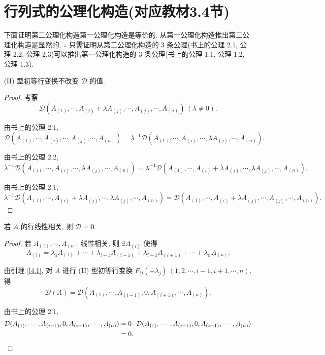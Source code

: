\documentclass{ctexart}
\begin{document}
\section{行列式的公理化构造(对应教材3.4节)}
下面证明第二公理化构造第一公理化构造是等价的. 从第一公理化构造推出第二公理化构造是显然的, $\therefore$ 只需证明从第二公理化构造的 3 条公理(书上的公理 2.1, 公理 2.2, 公理 2.3)可以推出第一公理化构造的 3 条公理(书上的公理 1.1, 公理 1.2, 公理 1.3).
\begin{lemma}\label{l4.1}
    (II) 型初等行变换不改变 $\mathcal{D}$ 的值.
\end{lemma}
\begin{proof}
    考察
    \[\mathcal{D}(A_{(1)},\cdots,A_{(i)}+\lambda A_{(j)},\cdots,A_{(j)},\cdots,A_{(n)})\ (\lambda\neq0).\]

    由书上的公理 2.1,
    \[\mathcal{D}(A_{(1)},\cdots,A_{(i)},\cdots,A_{(j)},\cdots,A_{(n)})=\lambda^{-1}\mathcal{D}(A_{(1)},\cdots,A_{(i)},\cdots,\lambda A_{(j)},\cdots,A_{(n)}).\]

    由书上的公理 2.2,
    \[\lambda^{-1}\mathcal{D}(A_{(1)},\cdots,A_{(i)},\cdots,\lambda A_{(j)},\cdots,A_{(n)})=\lambda^{-1}\mathcal{D}(A_{(1)},\cdots,A_{(i)}+\lambda A_{(j)},\cdots,\lambda A_{(j)},\cdots,A_{(n)}).\]

    由书上的公理 2.1,
    \[\lambda^{-1}\mathcal{D}(A_{(1)},\cdots,A_{(i)}+\lambda A_{(j)},\cdots,\lambda A_{(j)},\cdots,A_{(n)})=\mathcal{D}(A_{(1)},\cdots,A_{(i)}+\lambda A_{(j)},\cdots,A_{(j)},\cdots,A_{(n)}).\]
\end{proof}
\begin{lemma}\label{l4.2}
    若 $A$ 的行线性相关, 则 $\mathcal{D}=0$.
\end{lemma}
\begin{proof}
    若 $A_{(1)},\cdots,A_{(n)}$ 线性相关, 则 $\exists A_{(i)}$ 使得
    \[A_{(i)}=\lambda_1A_{(1)}+\cdots+\lambda_{i-1}A_{(i-1)}+\lambda_{i+1}A_{(i+1)}+\cdots+\lambda_nA_{(n)}.\]

    由引理 \ref{l4.1}, 对 $A$ 进行 (II) 型初等行变换 $F_{ij}(-\lambda_j)\ (1,2,\cdots,i-1,i+1,\cdots,n)$, 得
    \[\mathcal{D}(A)=\mathcal{D}(A_{(1)},\cdots,A_{(i-1)},0,A_{(i+1)},\cdots,A_{(n)}).\]

    由书上的公理 2.1,
    \begin{align*}
        \mathcal{D}(A_{(1)},\cdots,A_{(i-1)},0,A_{(i+1)},\cdots,A_{(n)}) & =0\cdot\mathcal{D}(A_{(1)},\cdots,A_{(i-1)},0,A_{(i+1)},\cdots,A_{(n)}) \\
        & =0.\qedhere
    \end{align*}
\end{proof}
\end{document}
